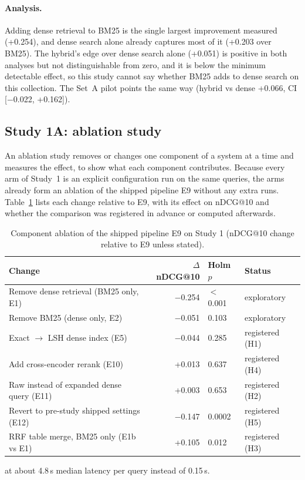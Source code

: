 \documentclass[11pt,a4paper]{article}
\makeatletter
\newcommand{\ndcg}{nDCG@10}
\makeatother
\begin{document}
\paragraph{Analysis.} Adding dense retrieval to BM25 is the single largest improvement measured (+0.254), and dense search alone already captures most of it (+0.203 over BM25). The hybrid's edge over dense search alone (+0.051) is positive in both analyses but not distinguishable from zero, and it is below the minimum detectable effect, so this study cannot say whether BM25 adds to dense search on this collection. The Set~A pilot points the same way (hybrid vs dense +0.066, CI [$-$0.022, +0.162]).

\subsection{Study 1A: ablation study}

An ablation study removes or changes one component of a system at a time and measures the effect, to show what each component contributes. Because every arm of Study~1 is an explicit configuration run on the same queries, the arms already form an ablation of the shipped pipeline E9 without any extra runs. Table~\ref{tab:ablation} lists each change relative to E9, with its effect on \ndcg{} and whether the comparison was registered in advance or computed afterwards.

\begin{table}[tbp]
\centering\small
\begin{threeparttable}
\caption{Component ablation of the shipped pipeline E9 on Study 1 (\ndcg{} change relative to E9 unless stated).}
\label{tab:ablation}
\begin{tabular}{lrll}
\toprule
Change & $\Delta$\ndcg{} & Holm $p$ & Status \\
\midrule
Remove dense retrieval (BM25 only, E1) & $-$0.254 & $<$0.001 & exploratory \\
Remove BM25 (dense only, E2) & $-$0.051 & 0.103 & exploratory \\
Exact $\rightarrow$ LSH dense index (E5) & $-$0.044 & 0.285 & registered (H1) \\
Add cross-encoder rerank (E10) & +0.013 & 0.637 & registered (H4)\tnote{a} \\
Raw instead of expanded dense query (E11) & +0.003 & 0.653 & registered (H2) \\
Revert to pre-study shipped settings (E12) & $-$0.147 & 0.0002 & registered (H5) \\
RRF table merge, BM25 only (E1b vs E1) & +0.105 & 0.012 & registered (H3) \\
\bottomrule
\end{tabular}
\begin{tablenotes}\footnotesize
\item[a] at about 4.8\,s median latency per query instead of 0.15\,s.
\end{tablenotes}
\end{threeparttable}
\end{table}
\end{document}
